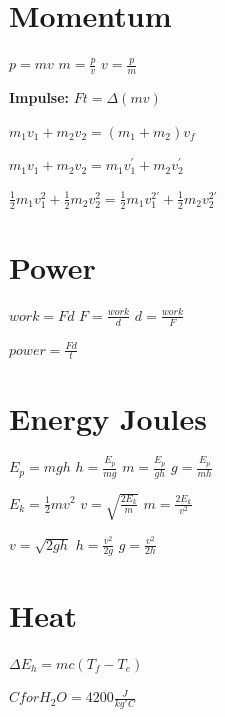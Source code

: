 \documentclass[11pt]{article}
\begin{document}
\section{Momentum}
\begin{multicols}{2}

$p=mv$ \overrightarrow{} $m=\frac{p}{v}$ \overrightarrow{} $v=\frac{p}{m}$

\textbf{Impulse:} $Ft=\Delta (mv)$

$m_{1}v_{1}+m_{2}v_{2}=(m_{1}+m_{2})v_{f}$

$m_{1}v_{1}+m_{2}v_{2}=m_{1}v_{1}^{\prime}+m_{2}v_{2}^{\prime}$

$\frac{1}{2}m_{1}v_{1}^2+\frac{1}{2}m_{2}v_{2}^2=\frac{1}{2}m_{1}v_{1}^{2\prime}+\frac{1}{2}m_{2}v_{2}^{2\prime}$
\end{multicols}

\newpage

\section{Power}
\begin{multicols}{2}

$work=Fd$ \overrightarrow{} $F=\frac{work}{d}$ \overrightarrow{} $d=\frac{work}{F}$

$power=\frac{Fd}{t}$
\end{multicols}

\section{Energy Joules}
\begin{multicols}{2}

$E_{p}=mgh$ \overrightarrow{} $h=\frac{E_{p}}{mg}$ \overrightarrow{} $m=\frac{E_{p}}{gh}$ \overrightarrow{} $g=\frac{E_{p}}{mh}$

$E_{k}=\frac{1}{2}mv^2$ \overrightarrow{} $v=\sqrt{\frac{2E_{k}}{m}}$ \overrightarrow{} $m=\frac{2E_{k}}{v^2}$

$v=\sqrt{2gh}$ \overrightarrow{} $h=\frac{v^2}{2g}$ \overrightarrow{} $g=\frac{v^2}{2h}$
\end{multicols}

\section{Heat}
\begin{multicols}{2}

$\Delta E_{h}=mc(T_{f}-T_{e})$

$C for H_{2}O=4200\frac{J}{kg^{\circ}C}$
\end{multicols}
\end{document}
